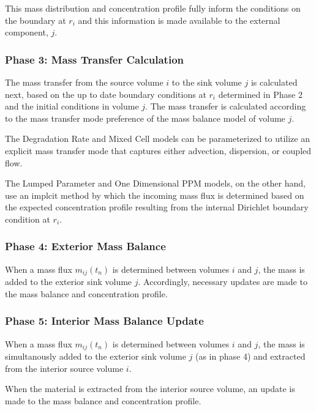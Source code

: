 This mass distribution and concentration profile fully inform 
the conditions on the boundary at $r_i$ and this information is made available 
to the external component, $j$.


\subsubsection{Phase 3: Mass Transfer Calculation}

The mass transfer from the source volume $i$ to the sink volume $j$ is 
calculated next, based on the up to date boundary conditions at $r_i$ 
determined in Phase 2 and the initial conditions in volume $j$. The mass 
transfer is calculated according to the mass transfer mode preference of the 
mass balance model of volume $j$.  

The Degradation Rate and Mixed Cell models can be parameterized to utilize an 
explicit mass transfer mode that captures either advection, dispersion, or coupled flow. 

The Lumped Parameter and One Dimensional PPM models, on the other hand, use an 
implcit method by which the incoming mass flux is determined based on the 
expected concentration profile resulting from the internal 
Dirichlet boundary condition at $r_i$. 

\subsubsection{Phase 4: Exterior Mass Balance}

When a mass flux $m_{ij}(t_n)$ is determined between volumes $i$ and $j$, the 
mass is added to the exterior sink volume $j$. Accordingly, necessary updates 
are made to the mass balance and concentration profile. 



\subsubsection{Phase 5: Interior Mass Balance Update}
When a mass flux $m_{ij}(t_n)$ is determined between volumes $i$ and $j$, the 
mass is simultanously added to the exterior sink volume $j$ (as in phase 4) and 
extracted from the interior source volume $i$.

When the material is extracted from the interior source volume, an update is 
made to the mass balance and concentration profile. 

\begin{align}
\end{align}

